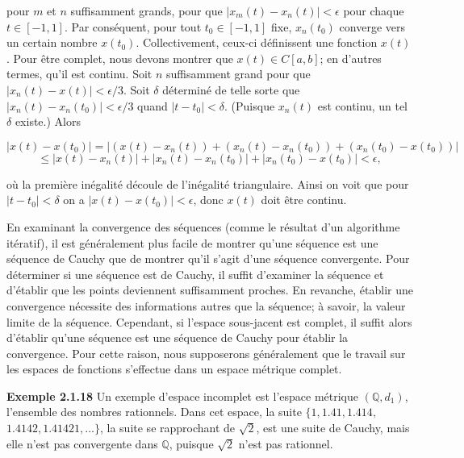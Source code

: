 \documentclass[11pt,twoside,a4paper]{article}
\begin{document}
pour $m$ et $n$ suffisamment grands, pour que $|x_m(t) - x_n(t)| < \epsilon$ pour chaque $t \in [-1, 1]$. Par conséquent, pour tout $t_0 \in [-1, 1]$ fixe, $x_n(t_0)$ converge vers un certain nombre $x(t_0)$. Collectivement, ceux-ci définissent une fonction $x(t)$. 
Pour être complet, nous devons montrer que $x(t) \in C[a, b]$; en d'autres termes, qu'il est continu. Soit $n$ suffisamment grand pour que $|x_n(t) - x(t)| < \epsilon/3$. Soit $\delta$ déterminé de telle sorte que $|x_n(t) - x_n(t_0)| < \epsilon/3$ quand $|t - t_0| < \delta$. (Puisque $x_n(t)$ est continu, un tel $\delta$ existe.) Alors

\begin{equation*}
  |x(t) - x(t_0)| = |(x(t) - x_n(t)) + (x_n(t) - x_n(t_0)) + (x_n(t_0) - x(t_0))|
\end{equation*}
\begin{equation*}
  \leq |x(t) - x_n(t)| + |x_n(t) - x_n(t_0)| + |x_n(t_0) - x(t_0)| < \epsilon,
\end{equation*}

où la première inégalité découle de l'inégalité triangulaire. Ainsi on voit que pour $|t - t_0| < \delta$ on a $|x(t) - x(t_0)| < \epsilon$, donc $x(t)$ doit être continu.
\vspace{5mm}

En examinant la convergence des séquences (comme le résultat d'un algorithme itératif), il est généralement plus facile de montrer qu'une séquence est une séquence de Cauchy que de montrer qu'il s'agit d'une séquence convergente. 
Pour déterminer si une séquence est de Cauchy, il suffit d'examiner la séquence et d'établir que les points deviennent suffisamment proches. En revanche, établir une convergence nécessite des informations autres que la séquence; 
à savoir, la valeur limite de la séquence. Cependant, si l'espace sous-jacent est complet, il suffit alors d'établir qu'une séquence est une séquence de Cauchy pour établir la convergence. Pour cette raison, nous supposerons 
généralement que le travail sur les espaces de fonctions s'effectue dans un espace métrique complet.
\vspace{7mm}

\textbf{Exemple 2.1.18} Un exemple d'espace incomplet est l'espace métrique $(\mathbb{Q}, d_1)$, l'ensemble des nombres rationnels. Dans cet espace, la suite $\{1, 1.41, 1.414,$ $1.4142, 1.41421, \ldots\}$, la suite se rapprochant de $\sqrt{2}$, 
est une suite de Cauchy, mais elle n'est pas convergente dans $\mathbb{Q}$, puisque $\sqrt{2}$ n'est pas rationnel.
\end{document}
